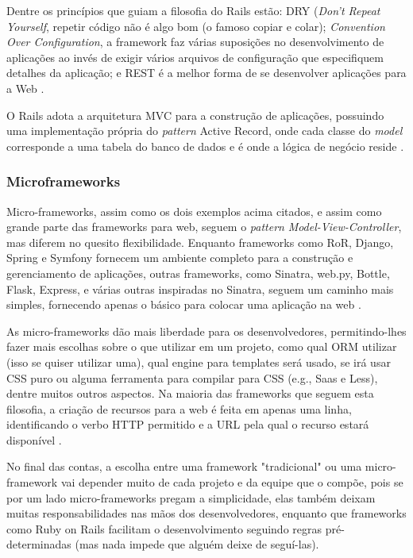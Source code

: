 \documentclass[diss]{template/setrem}
\begin{document}
Dentre os princípios que guiam a filosofia do Rails estão: DRY (\emph{Don't Repeat Yourself}, repetir código não é algo bom (o famoso copiar e colar); \emph{Convention Over Configuration}, a framework faz várias suposições no desenvolvimento de aplicações ao invés de exigir vários arquivos de configuração que especifiquem detalhes da aplicação; e REST é a melhor forma de se desenvolver aplicações para a Web \citep{Ruby2009}.

O Rails adota a arquitetura MVC para a construção de aplicações, possuindo uma implementação própria do \emph{pattern} Active Record, onde cada classe do \emph{model} corresponde a uma tabela do banco de dados e é onde a lógica de negócio reside \citep{Ruby2009}.



\subsubsection{Microframeworks}
Micro-frameworks, assim como os dois exemplos acima citados, e assim como grande parte das frameworks para web, seguem o \emph{pattern} \emph{Model-View-Controller}, mas diferem no quesito flexibilidade. Enquanto frameworks como RoR, Django, Spring e Symfony fornecem um ambiente completo para a construção e gerenciamento de aplicações, outras frameworks, como Sinatra, web.py, Bottle, Flask, Express, e várias outras inspiradas no Sinatra, seguem um caminho mais simples, fornecendo apenas o básico para colocar uma aplicação na web \citep{Streicher2009}.

As micro-frameworks dão mais liberdade para os desenvolvedores, permitindo-lhes fazer mais escolhas sobre o que utilizar em um projeto, como qual ORM utilizar (isso se quiser utilizar uma), qual engine para templates será usado, se irá usar CSS puro ou alguma ferramenta para compilar para CSS (e.g., Saas e Less), dentre muitos outros aspectos. Na maioria das frameworks que seguem esta filosofia, a criação de recursos para a web é feita em apenas uma linha, identificando o verbo HTTP permitido e a URL pela qual o recurso estará disponível \citep{Streicher2009}.

No final das contas, a escolha entre uma framework "tradicional" ou uma micro-framework vai depender muito de cada projeto e da equipe que o compõe, pois se por um lado micro-frameworks pregam a simplicidade, elas também deixam muitas responsabilidades nas mãos dos desenvolvedores, enquanto que frameworks como Ruby on Rails facilitam o desenvolvimento seguindo regras pré-determinadas (mas nada impede que alguém deixe de seguí-las).
\end{document}
